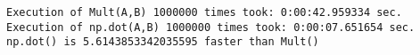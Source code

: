 \documentclass[11pt]{article}
\makeatletter
\newcommand{\boxspacing}{\kern\kvtcb@left@rule\kern\kvtcb@boxsep}
\newcommand{\prompt}[4]{
        {\ttfamily\llap{{\color{#2}[#3]:\hspace{3pt}#4}}\vspace{-\baselineskip}}
    }
\makeatother
\begin{document}
    \begin{Verbatim}[commandchars=\\\{\}]
Execution of Mult(A,B) 1000000 times took: 0:00:42.959334 sec.
Execution of np.dot(A,B) 1000000 times took: 0:00:07.651654 sec.
np.dot() is 5.6143853342035595 faster than Mult()
    \end{Verbatim}

    \begin{tcolorbox}[breakable, size=fbox, boxrule=1pt, pad at break*=1mm,colback=cellbackground, colframe=cellborder]
\prompt{In}{incolor}{ }{\boxspacing}
\begin{Verbatim}[commandchars=\\\{\}]

\end{Verbatim}
\end{tcolorbox}


    
    
    
\end{document}
